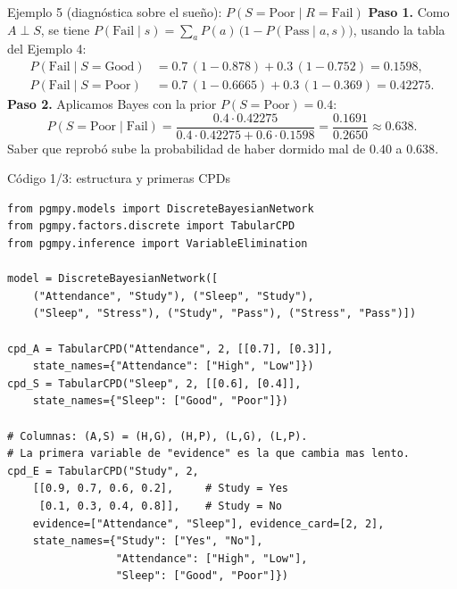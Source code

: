 \documentclass[11pt]{beamer}
\newcommand{\Pp}[1]{P\!\left(#1\right)}
\begin{document}
\begin{frame}{Ejemplo 5 (diagnóstica sobre el sueño): $\Pp{S=\text{Poor}\mid R=\text{Fail}}$}
  \textbf{Paso 1.} Como $A\perp S$, se tiene $\Pp{\text{Fail}\mid s}=\sum_a\Pp{a}\,\bigl(1-\Pp{\text{Pass}\mid a,s}\bigr)$, usando la tabla del Ejemplo 4:
  \begin{align*}
    \Pp{\text{Fail}\mid S=\text{Good}}&=0.7\,(1-0.878)+0.3\,(1-0.752)=0.1598,\\
    \Pp{\text{Fail}\mid S=\text{Poor}}&=0.7\,(1-0.6665)+0.3\,(1-0.369)=0.42275.
  \end{align*}
  \textbf{Paso 2.} Aplicamos Bayes con la prior $\Pp{S=\text{Poor}}=0.4$:
  \[
    \Pp{S=\text{Poor}\mid\text{Fail}}
    =\frac{0.4\cdot0.42275}{0.4\cdot0.42275+0.6\cdot0.1598}
    =\frac{0.1691}{0.2650}\approx0.638.
  \]
  Saber que reprobó sube la probabilidad de haber dormido mal de $0.40$ a $0.638$.
\end{frame}

\begin{frame}[fragile]{Código 1/3: estructura y primeras CPDs}
\begin{lstlisting}
from pgmpy.models import DiscreteBayesianNetwork
from pgmpy.factors.discrete import TabularCPD
from pgmpy.inference import VariableElimination

model = DiscreteBayesianNetwork([
    ("Attendance", "Study"), ("Sleep", "Study"),
    ("Sleep", "Stress"), ("Study", "Pass"), ("Stress", "Pass")])

cpd_A = TabularCPD("Attendance", 2, [[0.7], [0.3]],
    state_names={"Attendance": ["High", "Low"]})
cpd_S = TabularCPD("Sleep", 2, [[0.6], [0.4]],
    state_names={"Sleep": ["Good", "Poor"]})

# Columnas: (A,S) = (H,G), (H,P), (L,G), (L,P).
# La primera variable de "evidence" es la que cambia mas lento.
cpd_E = TabularCPD("Study", 2,
    [[0.9, 0.7, 0.6, 0.2],     # Study = Yes
     [0.1, 0.3, 0.4, 0.8]],    # Study = No
    evidence=["Attendance", "Sleep"], evidence_card=[2, 2],
    state_names={"Study": ["Yes", "No"],
                 "Attendance": ["High", "Low"],
                 "Sleep": ["Good", "Poor"]})
\end{lstlisting}
\end{frame}
\end{document}
